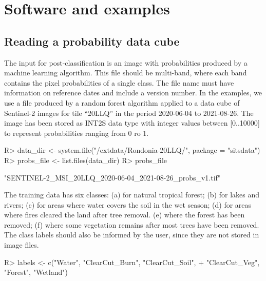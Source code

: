 \documentclass[
  shortnames]{jss}
\begin{document}
\hypertarget{software-and-examples}{%
\section{Software and examples}\label{software-and-examples}}

\hypertarget{reading-a-probability-data-cube}{%
\subsection{Reading a probability data cube}\label{reading-a-probability-data-cube}}

The input for post-classification is an image with probabilities produced by a machine learning algorithm. This file should be multi-band, where each band contains the pixel probabilities of a single class. The file name must have information on reference dates and include a version number. In the examples, we use a file produced by a random forest algorithm applied to a data cube of Sentinel-2 images for tile ``20LLQ'' in the period 2020-06-04 to 2021-08-26. The image has been stored as INT2S data type with integer values between {[}0..10000{]} to represent probabilities ranging from 0 ro 1.

\begin{CodeChunk}
\begin{CodeInput}
R> data_dir <- system.file("/extdata/Rondonia-20LLQ/", package = "sitsdata")
R> probs_file <- list.files(data_dir)
R> probs_file
\end{CodeInput}
\begin{CodeOutput}
[1] "SENTINEL-2_MSI_20LLQ_2020-06-04_2021-08-26_probs_v1.tif"
\end{CodeOutput}
\end{CodeChunk}

The training data has six classes: (a)  for natural tropical forest; (b)  for lakes and rivers; (c)  for areas where water covers the soil in the wet season; (d)  for areas where fires cleared the land after tree removal. (e)  where the forest has been removed; (f)  where some vegetation remains after most trees have been removed. The class labels should also be informed by the user, since they are not stored in image files.

\begin{CodeChunk}
\begin{CodeInput}
R> labels <- c("Water", "ClearCut_Burn", "ClearCut_Soil",
+             "ClearCut_Veg", "Forest", "Wetland")
\end{CodeInput}
\end{CodeChunk}
\end{document}
